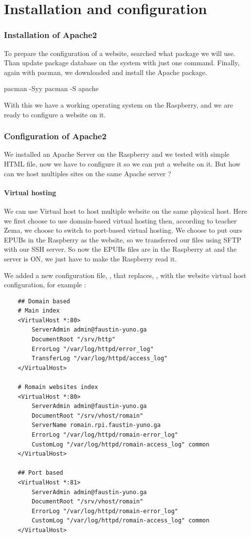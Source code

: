 \documentclass[11pt]{article}
\begin{document}
\part{Installation and configuration}
\setcounter{section}{0}
\section{Installation of Apache2}
To prepare the configuration of a website, searched what package we will use. Than update package database on the system with just one command. Finally, again with pacman, we downloaded and install the Apache package.
\begin{bash}
    pacman -Syy
    pacman -S apache
\end{bash}

With this we have a working operating system on the Raspberry, and we are ready to configure a website on it.

\section{Configuration of Apache2}

We installed an Apache Server on the Raspberry and we tested with simple HTML file, now we have to configure it so we can put a website on it. But how can we host multiples sites on the same Apache server ?

\subsection{Virtual hosting}
We can use Virtual host to host multiple website on the same physical host. Here we first choose to use domain-based virtual hosting then, according to teacher Zema, we choose to switch to port-based virtual hosting.
We choose to put ours EPUBs in the Raspberry as the website, so we transferred our files using SFTP with our SSH server.
So now the EPUBs files are in the Raspberry at  and the server is ON, we just have to make the Raspberry read it.

We added a new configuration file, , that replaces, , with the website virtual host configuration, for example :
\begin{verbatim}
    ## Domain based
    # Main index
    <VirtualHost *:80>
        ServerAdmin admin@faustin-yuno.ga
        DocumentRoot "/srv/http"
        ErrorLog "/var/log/httpd/error_log"
        TransferLog "/var/log/httpd/access_log"
    </VirtualHost>

    # Romain websites index
    <VirtualHost *:80>
        ServerAdmin admin@faustin-yuno.ga
        DocumentRoot "/srv/vhost/romain"
        ServerName romain.rpi.faustin-yuno.ga
        ErrorLog "/var/log/httpd/romain-error_log"
        CustomLog "/var/log/httpd/romain-access_log" common
    </VirtualHost>

    ## Port based
    <VirtualHost *:81>
        ServerAdmin admin@faustin-yuno.ga
        DocumentRoot "/srv/vhost/romain"
        ErrorLog "/var/log/httpd/romain-error_log"
        CustomLog "/var/log/httpd/romain-access_log" common
    </VirtualHost>
\end{verbatim}
\end{document}
